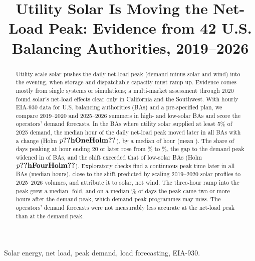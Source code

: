 \documentclass[conference,a4paper]{IEEEtran}
\begin{document}
\title{Utility Solar Is Moving the Net-Load Peak: Evidence from 42 U.S. Balancing Authorities, 2019--2026}

\author{
}

\maketitle

\begin{abstract}
Utility-scale solar pushes the daily net-load peak (demand minus solar and wind) into the evening, when storage and dispatchable capacity must ramp up. Evidence comes mostly from single systems or simulations; a multi-market assessment through 2020 found solar's net-load effects clear only in California and the Southwest. With hourly EIA-930 data for  U.S. balancing authorities (BAs) and a pre-specified plan, we compare 2019--2020 and 2025--2026 summers in high- and low-solar BAs and score the operators' demand forecasts. In the  BAs where utility solar supplied at least 5\% of 2025 demand, the median hour of the daily net-load peak moved later in all  BAs with a change (Holm $p\res{hOneHolm}$), by a median of  hour (mean ). The share of days peaking at hour ending 20 or later rose from \% to \%, the gap to the demand peak widened in  of  BAs, and the shift exceeded that of low-solar BAs (Holm $p\res{hFourHolm}$). Exploratory checks find a continuous peak time later in all  BAs (median  hours), close to the shift predicted by scaling 2019--2020 solar profiles to 2025--2026 volumes, and attribute it to solar, not wind. The three-hour ramp into the peak grew a median -fold, and on a median \% of days the peak came two or more hours after the demand peak, which demand-peak programmes may miss. The operators' demand forecasts were not measurably less accurate at the net-load peak than at the demand peak.
\end{abstract}

\begin{IEEEkeywords}
Solar energy, net load, peak demand, load forecasting, EIA-930.
\end{IEEEkeywords}
\end{document}
